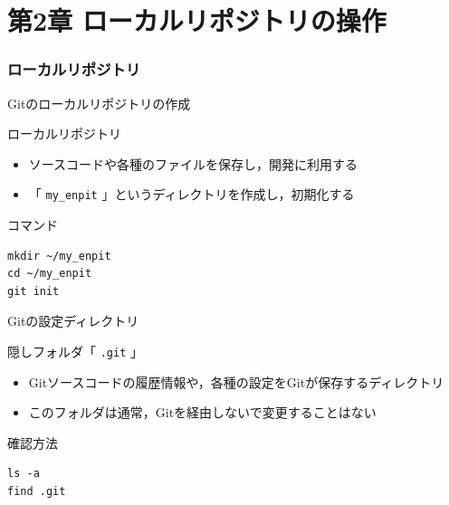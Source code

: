 \documentclass[t, aspectratio=169]{beamer}
\begin{document}
\part{第2章 ローカルリポジトリの操作}
\label{sec-2}
\section{ローカルリポジトリ}
\label{sec-2-1}
\begin{frame}[fragile,label=sec-2-1-1]{Gitのローカルリポジトリの作成}
 \begin{block}{ローカルリポジトリ}
\begin{itemize}
\item ソースコードや各種のファイルを保存し，開発に利用する
\item 「 \texttt{my\_enpit} 」というディレクトリを作成し，初期化する
\end{itemize}
\end{block}

\begin{block}{コマンド}
\begin{verbatim}
mkdir ~/my_enpit
cd ~/my_enpit
git init
\end{verbatim}
\end{block}
\end{frame}
\begin{frame}[fragile,label=sec-2-1-2]{Gitの設定ディレクトリ}
 \begin{block}{隠しフォルダ「 \texttt{.git} 」}
\begin{itemize}
\item Gitソースコードの履歴情報や，各種の設定をGitが保存するディレクトリ
\item このフォルダは通常，Gitを経由しないで変更することはない
\end{itemize}
\end{block}

\begin{block}{確認方法}
\begin{verbatim}
ls -a
find .git
\end{verbatim}
\end{block}
\end{frame}
\end{document}

